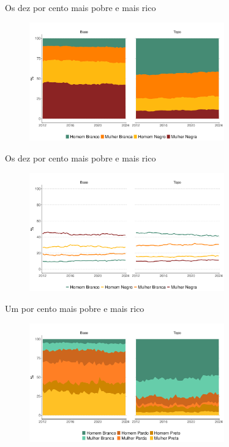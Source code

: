 \documentclass[10pt, xcolor=x11names,compress]{beamer}
\begin{document}
		\begin{frame}{Os dez por cento mais pobre e mais rico}
		\begin{figure}
			\centering
			\includegraphics[width = 0.75\textwidth]{figures_output/base_topo_10.pdf}
		\end{figure}
	\end{frame}
	
			\begin{frame}{Os dez por cento mais pobre e mais rico}
		\begin{figure}
			\centering
			\includegraphics[width = 0.75\textwidth]{figures_output/base_topo_10_linha.pdf}
		\end{figure}
	\end{frame}
	
		
		\begin{frame}{Um por cento mais pobre e mais rico}
		\begin{figure}
			\centering
			\includegraphics[width = 0.75\textwidth]{figures_output/base_topo_1_ppb.pdf}
		\end{figure}
	\end{frame}
	
\end{document}

